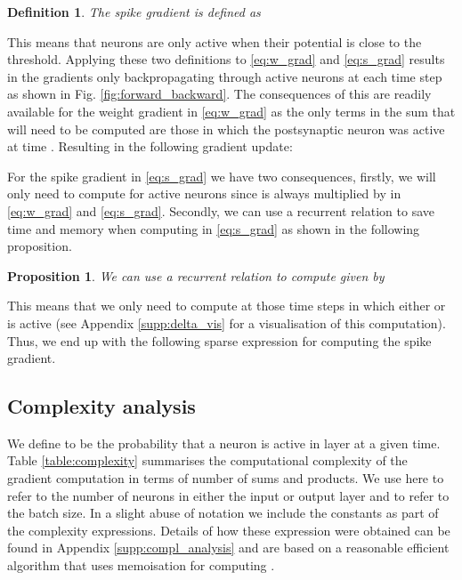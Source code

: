\documentclass{article}
\newtheorem{definition}{Definition}
\newtheorem{proposition}{Proposition}
\begin{document}
\begin{definition}
The spike gradient is defined as


\end{definition}

This means that neurons are only active when their potential is close to the threshold. Applying these two definitions to \eqref{eq:w_grad} and \eqref{eq:s_grad} results in the gradients only backpropagating through active neurons at each time step as shown in Fig. \ref{fig:forward_backward}. The consequences of this are readily available for the weight gradient in \eqref{eq:w_grad} as the only terms in the sum that will need to be computed are those in which the postsynaptic neuron  was active at time . Resulting in the following gradient update:



For the spike gradient in \eqref{eq:s_grad} we have two consequences, firstly, we will only need to compute \textcolor{mygreen}{} for active neurons since \textcolor{mygreen}{} is always multiplied by \textcolor{red}{} in \eqref{eq:w_grad} and \eqref{eq:s_grad}. Secondly, we can use a recurrent relation to save time and memory when computing  in \eqref{eq:s_grad} as shown in the following proposition.

\begin{proposition}
We can use a recurrent relation to compute  given by 

\end{proposition}

This means that we only need to compute  at those time steps in which either  or  is active (see Appendix \ref{supp:delta_vis} for a visualisation of this computation). Thus, we end up with the following sparse expression for computing the spike gradient.

\vspace{-0.3cm}


\subsection{Complexity analysis}

We define  to be the probability that a neuron is active in layer  at a given time. Table \ref{table:complexity} summarises the computational complexity of the gradient computation in terms of number of sums and products. We use here  to refer to the number of neurons in either the input or output layer and  to refer to the batch size. In a slight abuse of notation we include the constants  as part of the complexity expressions. Details of how these expression were obtained can be found in Appendix \ref{supp:compl_analysis} and are based on a reasonable efficient algorithm that uses memoisation for computing .
\end{document}
